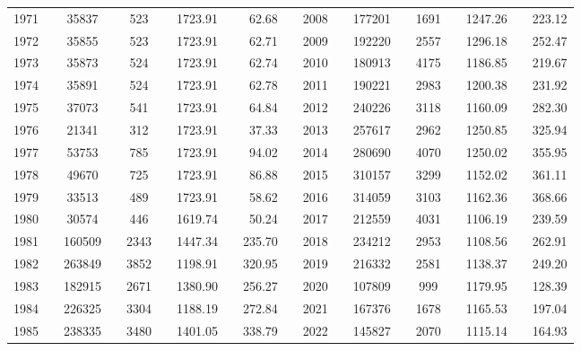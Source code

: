 \begin{table}[]
\begin{tabular}{llccccrrrlllccccrrr}
1971 &  & 35837 &  & 523 &  & 1723.91 &  & 62.68 &  & 2008 &  & 177201 &  & 1691 &  & 1247.26 &  & 223.12 \\
1972 &  & 35855 &  & 523 &  & 1723.91 &  & 62.71 &  & 2009 &  & 192220 &  & 2557 &  & 1296.18 &  & 252.47 \\
1973 &  & 35873 &  & 524 &  & 1723.91 &  & 62.74 &  & 2010 &  & 180913 &  & 4175 &  & 1186.85 &  & 219.67 \\
1974 &  & 35891 &  & 524 &  & 1723.91 &  & 62.78 &  & 2011 &  & 190221 &  & 2983 &  & 1200.38 &  & 231.92 \\
1975 &  & 37073 &  & 541 &  & 1723.91 &  & 64.84 &  & 2012 &  & 240226 &  & 3118 &  & 1160.09 &  & 282.30 \\
1976 &  & 21341 &  & 312 &  & 1723.91 &  & 37.33 &  & 2013 &  & 257617 &  & 2962 &  & 1250.85 &  & 325.94 \\
1977 &  & 53753 &  & 785 &  & 1723.91 &  & 94.02 &  & 2014 &  & 280690 &  & 4070 &  & 1250.02 &  & 355.95 \\
1978 &  & 49670 &  & 725 &  & 1723.91 &  & 86.88 &  & 2015 &  & 310157 &  & 3299 &  & 1152.02 &  & 361.11 \\
1979 &  & 33513 &  & 489 &  & 1723.91 &  & 58.62 &  & 2016 &  & 314059 &  & 3103 &  & 1162.36 &  & 368.66 \\
1980 &  & 30574 &  & 446 &  & 1619.74 &  & 50.24 &  & 2017 &  & 212559 &  & 4031 &  & 1106.19 &  & 239.59 \\
1981 &  & 160509 &  & 2343 &  & 1447.34 &  & 235.70 &  & 2018 &  & 234212 &  & 2953 &  & 1108.56 &  & 262.91 \\
1982 &  & 263849 &  & 3852 &  & 1198.91 &  & 320.95 &  & 2019 &  & 216332 &  & 2581 &  & 1138.37 &  & 249.20 \\
1983 &  & 182915 &  & 2671 &  & 1380.90 &  & 256.27 &  & 2020 &  & 107809 &  & 999 &  & 1179.95 &  & 128.39 \\
1984 &  & 226325 &  & 3304 &  & 1188.19 &  & 272.84 &  & 2021 &  & 167376 &  & 1678 &  & 1165.53 &  & 197.04 \\
1985 &  & 238335 &  & 3480 &  & 1401.05 &  & 338.79 &  & 2022 &  & 145827 &  & 2070 &  & 1115.14 &  & 164.93 \\ \hline
\end{tabular}
\end{table}
\endgroup{}
\endgroup{}
